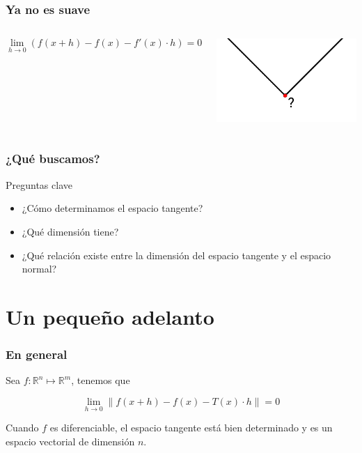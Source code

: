 \documentclass{beamer}
\def\realR{\mathbb{R}} %
\begin{document}
\begin{frame}
\frametitle{Ya no es suave}
\begin{columns}

    $$\lim_{h \to 0} (f(x+h) - f(x) - f'(x) \cdot h) = 0$$

    \begin{center}
        \includegraphics[scale=0.25]{curva-pico}
    \end{center}
\end{columns}
\end{frame}

\begin{frame}
  \frametitle{¿Qué buscamos?}

  \begin{block}{Preguntas clave}
    \begin{itemize}
      \item ¿Cómo determinamos el espacio tangente?
      \item ¿Qué dimensión tiene?
      \item ¿Qué relación existe entre la dimensión del espacio tangente y el espacio normal?
    \end{itemize}
  \end{block}
\end{frame}

\section{Un pequeño adelanto}

\begin{frame}
\frametitle{En general}

    Sea $f:\realR^{n} \mapsto \realR^{m}$, tenemos que

    $$\lim_{h \to 0} \| f(x+h) - f(x) - T(x) \cdot h \| = 0$$

    Cuando $f$ es diferenciable, el espacio tangente está bien determinado y es un espacio vectorial de dimensión $n$.



\end{frame}
\end{document}
